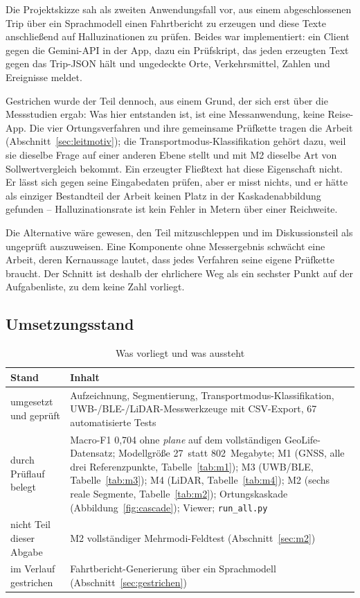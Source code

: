\documentclass[11pt,a4paper,oneside]{article}
\begin{document}
Die Projektskizze sah als zweiten Anwendungsfall vor, aus einem
abgeschlossenen Trip über ein Sprachmodell einen Fahrtbericht zu erzeugen
und diese Texte anschließend auf Halluzinationen zu prüfen. Beides war
implementiert: ein Client gegen die Gemini-API in der App, dazu ein
Prüfskript, das jeden erzeugten Text gegen das Trip-JSON hält und ungedeckte
Orte, Verkehrsmittel, Zahlen und Ereignisse meldet.

Gestrichen wurde der Teil dennoch, aus einem Grund, der sich erst über die
Messstudien ergab: Was hier entstanden ist, ist eine Messanwendung, keine
Reise-App. Die vier Ortungsverfahren und ihre gemeinsame Prüfkette tragen
die Arbeit (Abschnitt~\ref{sec:leitmotiv}); die Transportmodus-Klassifikation
gehört dazu, weil sie dieselbe Frage auf einer anderen Ebene stellt und mit
M2 dieselbe Art von Sollwertvergleich bekommt. Ein erzeugter Fließtext hat
diese Eigenschaft nicht. Er lässt sich gegen seine Eingabedaten prüfen, aber
er misst nichts, und er hätte als einziger Bestandteil der Arbeit keinen
Platz in der Kaskadenabbildung gefunden -- Halluzinationsrate ist kein
Fehler in Metern über einer Reichweite.

Die Alternative wäre gewesen, den Teil mitzuschleppen und im Diskussionsteil
als ungeprüft auszuweisen. Eine Komponente ohne Messergebnis schwächt eine
Arbeit, deren Kernaussage lautet, dass jedes Verfahren seine eigene
Prüfkette braucht. Der Schnitt ist deshalb der ehrlichere Weg als ein
sechster Punkt auf der Aufgabenliste, zu dem keine Zahl vorliegt.

\subsection{Umsetzungsstand}

\begin{table}[htbp]
\centering
\small
\caption{Was vorliegt und was aussteht}
\label{tab:stand}
\begin{tabularx}{\linewidth}{@{}>{\raggedright\arraybackslash}p{4.2cm}L@{}}
\toprule
\textbf{Stand} & \textbf{Inhalt} \\
\midrule
umgesetzt und geprüft & Aufzeichnung, Segmentierung, Transportmodus-Klassifikation,
UWB-/BLE-/LiDAR-Messwerkzeuge mit CSV-Export,
67 automatisierte Tests \\
\addlinespace
durch Prüflauf belegt & Macro-F1 0{,}704 ohne \emph{plane} auf dem
vollständigen GeoLife-Datensatz; Modellgröße 27~statt 802~Megabyte; M1
(GNSS, alle drei Referenzpunkte, Tabelle~\ref{tab:m1}); M3 (UWB/BLE,
Tabelle~\ref{tab:m3}); M4 (LiDAR, Tabelle~\ref{tab:m4}); M2 (sechs reale
Segmente, Tabelle~\ref{tab:m2}); Ortungskaskade (Abbildung~\ref{fig:cascade});
Viewer; \texttt{run\_all.py} \\
\addlinespace
nicht Teil dieser Abgabe & M2 vollständiger Mehrmodi-Feldtest
(Abschnitt~\ref{sec:m2}) \\
\addlinespace
im Verlauf gestrichen & Fahrtbericht-Generierung über ein Sprachmodell
(Abschnitt~\ref{sec:gestrichen}) \\
\bottomrule
\end{tabularx}
\end{table}
\end{document}
